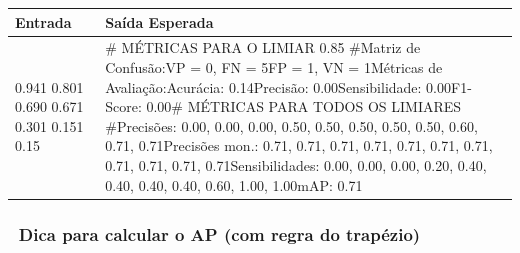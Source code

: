 \documentclass[
  portuguese,
  letterpaper,
  openany,
  oneside,
  12pt,
  a4paper]{book}
\begin{document}
\begin{longtable}[]{@{}
  >{\raggedright\arraybackslash}p{}
  >{\raggedright\arraybackslash}p{}@{}}
\toprule\noalign{}
\begin{minipage}[b]{\linewidth}\raggedright
Entrada
\end{minipage} & \begin{minipage}[b]{\linewidth}\raggedright
Saída Esperada
\end{minipage} \\
\midrule\noalign{}
\endhead
\bottomrule\noalign{}
\endlastfoot
70 0.941 0.801 0.690 0.671 0.301 0.151 0.15 & \# MÉTRICAS PARA O LIMIAR
0.85 \#Matriz de Confusão:VP = 0, FN = 5FP = 1, VN = 1Métricas de
Avaliação:Acurácia: 0.14Precisão: 0.00Sensibilidade: 0.00F1-Score:
0.00\# MÉTRICAS PARA TODOS OS LIMIARES \#Precisões: 0.00, 0.00, 0.00,
0.50, 0.50, 0.50, 0.50, 0.50, 0.60, 0.71, 0.71Precisões mon.: 0.71,
0.71, 0.71, 0.71, 0.71, 0.71, 0.71, 0.71, 0.71, 0.71,
0.71Sensibilidades: 0.00, 0.00, 0.00, 0.20, 0.40, 0.40, 0.40, 0.40,
0.60, 1.00, 1.00mAP: 0.71 \\
\end{longtable}

\subsubsection{🐍 Dica para calcular o AP (com regra do
trapézio)}\label{dica-para-calcular-o-ap-com-regra-do-trapuxe9zio}
\end{document}
